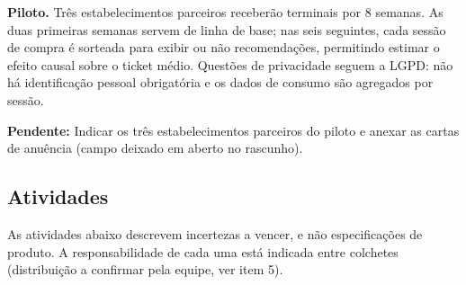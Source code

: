 \documentclass[12pt,a4paper]{article}
\newcommand{\pendente}[1]{\begin{pendbox}\textbf{\color{pendfg}Pendente:} #1\end{pendbox}}
\begin{document}
\textbf{Piloto.} Três estabelecimentos parceiros receberão terminais por 8 semanas. As duas primeiras semanas servem de linha de base; nas seis seguintes, cada sessão de compra é sorteada para exibir ou não recomendações, permitindo estimar o efeito causal sobre o ticket médio. Questões de privacidade seguem a LGPD: não há identificação pessoal obrigatória e os dados de consumo são agregados por sessão.

\pendente{Indicar os três estabelecimentos parceiros do piloto e anexar as cartas de anuência (campo deixado em aberto no rascunho).}

\subsection{Atividades}

As atividades abaixo descrevem incertezas a vencer, e não especificações de produto. A responsabilidade de cada uma está indicada entre colchetes (distribuição a confirmar pela equipe, ver item 5).
\end{document}
